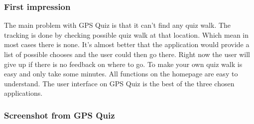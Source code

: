\documentclass{TDP003mall}
\begin{document}
\subsubsection{First impression}
The main problem with GPS Quiz is that it can't find any quiz walk. The tracking is done
by checking possible quiz walk at that location. Which mean in most cases there is none.
It's almost better that the application would provide a list of possible chooses and the user
could then go there. Right now the user will give up if there is no feedback on where to go.
To make your own quiz walk is easy and only take some minutes. All functions on the homepage
are easy to understand. The user interface on GPS Quiz is the best of the three chosen applications.

\subsubsection{Screenshot from GPS Quiz}
\end{document}
